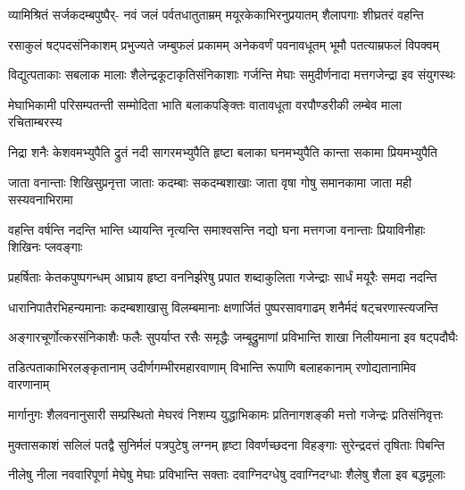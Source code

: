 \fourlineindentedshloka
{व्यामिश्रितं सर्जकदम्बपुष्पैर्-}
{नवं जलं पर्वतधातुताम्रम्}
{मयूरकेकाभिरनुप्रयातम्}
{शैलापगाः शीघ्रतरं वहन्ति} %

\fourlineindentedshloka
{रसाकुलं षट्पदसंनिकाशम्}
{प्रभुज्यते जम्बुफलं प्रकामम्}
{अनेकवर्णं पवनावधूतम्}
{भूमौ पतत्याम्रफलं विपक्वम्} %

\fourlineindentedshloka
{विद्युत्पताकाः सबलाक मालाः}
{शैलेन्द्रकूटाकृतिसंनिकाशाः}
{गर्जन्ति मेघाः समुदीर्णनादा}
{मत्तगजेन्द्रा इव संयुगस्थः} %

\fourlineindentedshloka
{मेघाभिकामी परिसम्पतन्ती}
{सम्मोदिता भाति बलाकपङ्क्तिः}
{वातावधूता वरपौण्डरीकी}
{लम्बेव माला रचिताम्बरस्य} %

\fourlineindentedshloka
{निद्रा शनैः केशवमभ्युपैति}
{द्रुतं नदी सागरमभ्युपैति}
{हृष्टा बलाका घनमभ्युपैति}
{कान्ता सकामा प्रियमभ्युपैति} %

\fourlineindentedshloka
{जाता वनान्ताः शिखिसुप्रनृत्ता}
{जाताः कदम्बाः सकदम्बशाखाः}
{जाता वृषा गोषु समानकामा}
{जाता मही सस्यवनाभिरामा} %

\fourlineindentedshloka
{वहन्ति वर्षन्ति नदन्ति भान्ति}
{ध्यायन्ति नृत्यन्ति समाश्वसन्ति}
{नद्यो घना मत्तगजा वनान्ताः}
{प्रियाविनीहाः शिखिनः प्लवङ्गाः} %

\fourlineindentedshloka
{प्रहर्षिताः केतकपुष्पगन्धम्}
{आघ्राय हृष्टा वननिर्झरेषु}
{प्रपात शब्दाकुलिता गजेन्द्राः}
{सार्धं मयूरैः समदा नदन्ति} %

\fourlineindentedshloka
{धारानिपातैरभिहन्यमानाः}
{कदम्बशाखासु विलम्बमानाः}
{क्षणार्जितं पुष्परसावगाढम्}
{शनैर्मदं षट्चरणास्त्यजन्ति} %

\fourlineindentedshloka
{अङ्गारचूर्णोत्करसंनिकाशैः}
{फलैः सुपर्याप्त रसैः समृद्धैः}
{जम्बूद्रुमाणां प्रविभान्ति शाखा}
{निलीयमाना इव षट्पदौघैः} %

\fourlineindentedshloka
{तडित्पताकाभिरलङ्कृतानाम्}
{उदीर्णगम्भीरमहारवाणाम्}
{विभान्ति रूपाणि बलाहकानाम्}
{रणोद्यतानामिव वारणानाम्} %

\fourlineindentedshloka
{मार्गानुगः शैलवनानुसारी}
{सम्प्रस्थितो मेघरवं निशम्य}
{युद्धाभिकामः प्रतिनागशङ्की}
{मत्तो गजेन्द्रः प्रतिसंनिवृत्तः} %

\fourlineindentedshloka
{मुक्तासकाशं सलिलं पतद्वै}
{सुनिर्मलं पत्रपुटेषु लग्नम्}
{हृष्टा विवर्णच्छदना विहङ्गाः}
{सुरेन्द्रदत्तं तृषिताः पिबन्ति} %

\fourlineindentedshloka
{नीलेषु नीला नववारिपूर्णा}
{मेघेषु मेघाः प्रविभान्ति सक्ताः}
{दवाग्निदग्धेषु दवाग्निदग्धाः}
{शैलेषु शैला इव बद्धमूलाः} %

